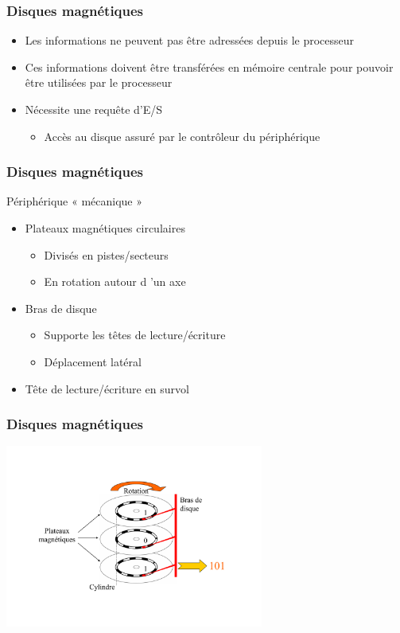 \begin{frame}
\frametitle{Disques magnétiques}
\begin{itemize}
\item Les informations ne peuvent pas être adressées depuis le processeur
\item Ces informations doivent être transférées en mémoire centrale pour pouvoir être utilisées par le processeur
\item Nécessite une requête d’E/S
\begin{itemize}
\item Accès au disque assuré par le contrôleur du périphérique
\end{itemize}
\end{itemize}
\end{frame}


\begin{frame}
\frametitle{Disques magnétiques}
Périphérique « mécanique »
\begin{itemize}
\item Plateaux magnétiques circulaires
\begin{itemize}
\item Divisés en pistes/secteurs
\item En rotation autour d ’un axe
\end{itemize}
\item Bras de disque
\begin{itemize}
\item Supporte les têtes de lecture/écriture
\item Déplacement latéral
\end{itemize}
\item Tête de lecture/écriture en survol
\end{itemize}
\end{frame}


\begin{frame}
\frametitle{Disques magnétiques}
\includegraphics[height=6cm]{../illustration/decomp_hd.pdf}
\end{frame}



